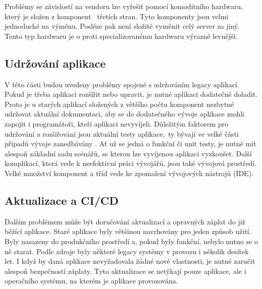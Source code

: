 Problémy se závislostí na vendoru lze vyřešit pomocí komoditního hardwaru, který je složen z komponent  třetích stran. Tyto komponenty jsou velmi jednoduché na výměnu. Posléze pak není složité vyměnit celý server za jiný. Tento typ hardwaru je o proti specializovanému hardwaru výrazně levnější. 

\subsection{Udržování aplikace}
V této části budou uvedeny problémy spojené s udržováním legacy aplikací. Pokud je třeba aplikaci rozšířit nebo upravit, je nutné aplikaci dodatečně doladit. Proto je u starých aplikací složených z většího počtu komponent nezbytné udržovat aktuální dokumentaci, aby se do dodatečného vývoje aplikace mohli zapojit i programátoři, kteří aplikaci nevyvíjeli. Důležitým faktorem pro udržování a rozšiřování jsou aktuální testy aplikace, ty bývají ve velké části případů vývoje zanedbávány \cite{legacy_testy}. Ať už se jedná o funkční či unit testy, je nutné mít alespoň základní sadu scénářů, se kterou lze vyvíjenou aplikaci vyzkoušet. Další komplikací, která vede k neefektivní práci vývojářů, jsou také vývojová prostředí. Velké množství komponent a tříd vede ke zpomalení vývojových nástrojů (IDE).

\subsection{Aktualizace a CI/CD}
Dalším problémem může být doručování aktualizací a opravných záplat do již běžící aplikace. Staré aplikace byly většinou navrhovány pro jeden způsob užití. Byly nasazeny do produkčního prostředí a, pokud byly funkční, nebylo nutno se o ně starat. Podle zdroje \cite{legacy_years} byly některé legacy systémy v provozu i několik desítek let. I když by daná aplikace nevyžadovala žádné nové vlastnosti, je nutné zaručit alespoň bezpečností záplaty. Tyto aktualizace se netýkají pouze aplikace, ale i operačního systému, na kterém je aplikace provozována.


